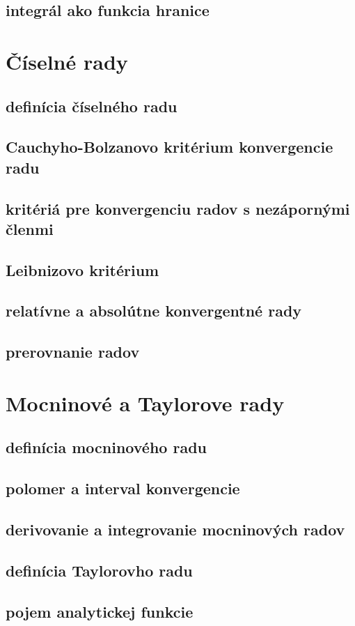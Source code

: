 \subsection{integrál ako funkcia hranice}


\section{Číselné rady}
\subsection{definícia číselného radu}
\subsection{Cauchyho-Bolzanovo kritérium konvergencie radu}
\subsection{kritériá pre konvergenciu radov s nezápornými členmi}
\subsection{Leibnizovo kritérium}
\subsection{relatívne a absolútne konvergentné rady}
\subsection{prerovnanie radov}


\section{Mocninové a Taylorove rady}
\subsection{definícia mocninového radu}
\subsection{polomer a interval konvergencie}
\subsection{derivovanie a integrovanie mocninových radov}
\subsection{definícia Taylorovho radu}
\subsection{pojem analytickej funkcie}


